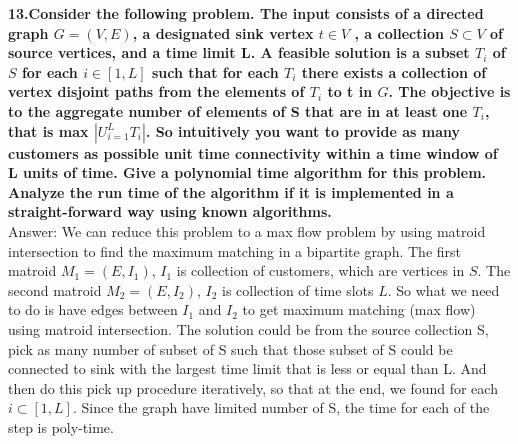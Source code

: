 \documentclass{article}
\begin{document}
\noindent
\textbf{13.Consider the following problem. The input consists of a directed graph $G = (V, E)$, a designated sink vertex $t\in V$ , a collection $S\subset V$ of source vertices, and a time limit L. A feasible solution is a subset $T_i$ of $S$ for each $i\in [1,L]$ such that for each $T_i$ there exists a collection of vertex disjoint paths from the elements of $T_i$ to t in $G$. The objective is to the aggregate number of elements of S that are in at least one $T_i$, that is max $|U_{i=1}^{L}T_i|$. So intuitively you want to provide as many customers as possible unit time connectivity within a time window of L units of time. Give a polynomial time algorithm for this problem. Analyze the run time of the algorithm if it is implemented in a straight-forward way using known algorithms.}\\ \newline
\noindent
Answer: We can reduce this problem to a max flow problem by using matroid intersection to find the maximum matching in a bipartite graph. The first matroid $M_1 = (E, I_1)$, $I_1$ is collection of customers, which are vertices in $S$. The second matroid $M_2 = (E, I_2)$, $I_2$ is collection of time slots $L$. So what we need to do is have edges between $I_1$ and $I_2$ to get maximum matching (max flow) using matroid intersection. The solution could be from the source collection S, pick as many number of subset of S such that those subset of S could be connected to sink with the largest time limit that is less or equal than L. And then do this pick up procedure iteratively, so that at the end, we found for each $i \subset [1,L]$. Since the graph have limited number of S, the time for each of the step is poly-time.
\end{document}
